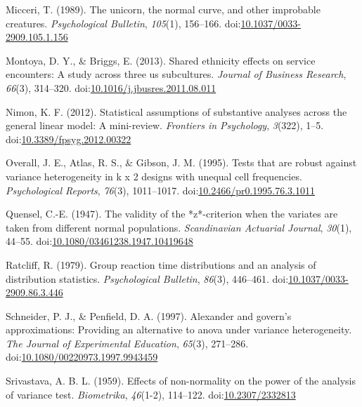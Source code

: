 \documentclass[man,floatsintext]{apa6}
\begin{document}
\leavevmode\hypertarget{ref-Micceri_1989}{}%
Micceri, T. (1989). The unicorn, the normal curve, and other improbable creatures. \emph{Psychological Bulletin}, \emph{105}(1), 156--166. doi:\href{https://doi.org/10.1037/0033-2909.105.1.156}{10.1037/0033-2909.105.1.156}

\leavevmode\hypertarget{ref-Montoya_Briggs_2013}{}%
Montoya, D. Y., \& Briggs, E. (2013). Shared ethnicity effects on service encounters: A study across three us subcultures. \emph{Journal of Business Research}, \emph{66}(3), 314--320. doi:\href{https://doi.org/10.1016/j.jbusres.2011.08.011}{10.1016/j.jbusres.2011.08.011}

\leavevmode\hypertarget{ref-Nimon_2012}{}%
Nimon, K. F. (2012). Statistical assumptions of substantive analyses across the general linear model: A mini-review. \emph{Frontiers in Psychology}, \emph{3}(322), 1--5. doi:\href{https://doi.org/10.3389/fpsyg.2012.00322}{10.3389/fpsyg.2012.00322}

\leavevmode\hypertarget{ref-Overall_et_al_1995}{}%
Overall, J. E., Atlas, R. S., \& Gibson, J. M. (1995). Tests that are robust against variance heterogeneity in k x 2 designs with unequal cell frequencies. \emph{Psychological Reports}, \emph{76}(3), 1011--1017. doi:\href{https://doi.org/10.2466/pr0.1995.76.3.1011}{10.2466/pr0.1995.76.3.1011}

\leavevmode\hypertarget{ref-Quensel_1947}{}%
Quensel, C.-E. (1947). The validity of the *z*-criterion when the variates are taken from different normal populations. \emph{Scandinavian Actuarial Journal}, \emph{30}(1), 44--55. doi:\href{https://doi.org/10.1080/03461238.1947.10419648}{10.1080/03461238.1947.10419648}

\leavevmode\hypertarget{ref-Ratcliff_1979}{}%
Ratcliff, R. (1979). Group reaction time distributions and an analysis of distribution statistics. \emph{Psychological Bulletin}, \emph{86}(3), 446--461. doi:\href{https://doi.org/10.1037/0033-2909.86.3.446}{10.1037/0033-2909.86.3.446}

\leavevmode\hypertarget{ref-Schneider_and_Penfield_1997}{}%
Schneider, P. J., \& Penfield, D. A. (1997). Alexander and govern's approximations: Providing an alternative to anova under variance heterogeneity. \emph{The Journal of Experimental Education}, \emph{65}(3), 271--286. doi:\href{https://doi.org/10.1080/00220973.1997.9943459}{10.1080/00220973.1997.9943459}

\leavevmode\hypertarget{ref-Srivastava_1959}{}%
Srivastava, A. B. L. (1959). Effects of non-normality on the power of the analysis of variance test. \emph{Biometrika}, \emph{46}(1-2), 114--122. doi:\href{https://doi.org/10.2307/2332813}{10.2307/2332813}
\end{document}
